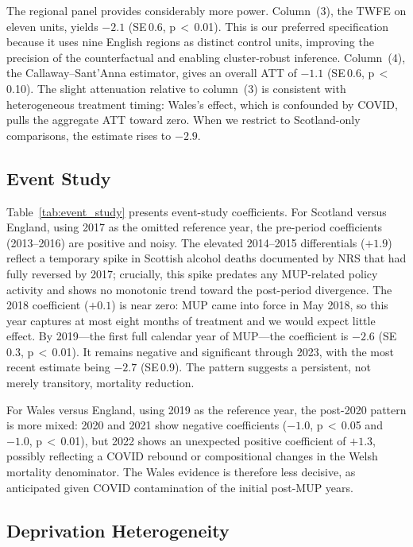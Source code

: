 \documentclass[12pt]{article}
\begin{document}
The regional panel provides considerably more power. Column~(3), the TWFE on eleven units, yields $-2.1$ (SE\,0.6, p\,$<$\,0.01). This is our preferred specification because it uses nine English regions as distinct control units, improving the precision of the counterfactual and enabling cluster-robust inference. Column~(4), the Callaway--Sant'Anna estimator, gives an overall ATT of $-1.1$ (SE\,0.6, p\,$<$\,0.10). The slight attenuation relative to column~(3) is consistent with heterogeneous treatment timing: Wales's effect, which is confounded by COVID, pulls the aggregate ATT toward zero. When we restrict to Scotland-only comparisons, the estimate rises to $-2.9$.



\subsection{Event Study}

Table~\ref{tab:event_study} presents event-study coefficients. For Scotland versus England, using 2017 as the omitted reference year, the pre-period coefficients (2013--2016) are positive and noisy. The elevated 2014--2015 differentials ($+1.9$) reflect a temporary spike in Scottish alcohol deaths documented by NRS that had fully reversed by 2017; crucially, this spike predates any MUP-related policy activity and shows no monotonic trend toward the post-period divergence. The 2018 coefficient ($+0.1$) is near zero: MUP came into force in May 2018, so this year captures at most eight months of treatment and we would expect little effect. By 2019---the first full calendar year of MUP---the coefficient is $-2.6$ (SE\,0.3, p\,$<$\,0.01). It remains negative and significant through 2023, with the most recent estimate being $-2.7$ (SE\,0.9). The pattern suggests a persistent, not merely transitory, mortality reduction.

For Wales versus England, using 2019 as the reference year, the post-2020 pattern is more mixed: 2020 and 2021 show negative coefficients ($-1.0$, p\,$<$\,0.05 and $-1.0$, p\,$<$\,0.01), but 2022 shows an unexpected positive coefficient of $+1.3$, possibly reflecting a COVID rebound or compositional changes in the Welsh mortality denominator. The Wales evidence is therefore less decisive, as anticipated given COVID contamination of the initial post-MUP years.



\subsection{Deprivation Heterogeneity}
\end{document}

